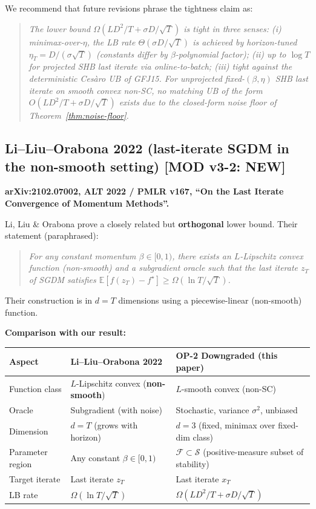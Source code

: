 \documentclass[11pt,a4paper]{article}
\theoremstyle{plain}
\theoremstyle{definition}
\theoremstyle{remark}
\newcommand{\E}{\mathbb{E}}
\newcommand{\F}{\mathcal{F}}
\newcommand{\Sset}{\mathcal{S}}
\begin{document}
We recommend that future revisions phrase the tightness claim as:

\begin{quote}
\emph{The lower bound $\Omega(LD^2/T + \sigma D/\sqrt T)$ is tight in three senses: (i) minimax-over-$\eta$, the LB rate $\Theta(\sigma D/\sqrt T)$ is achieved by horizon-tuned $\eta_T = D/(\sigma\sqrt T)$ (constants differ by $\beta$-polynomial factor); (ii) up to $\log T$ for projected SHB last iterate via online-to-batch; (iii) tight against the deterministic Ces\`aro UB of GFJ15. For unprojected fixed-$(\beta,\eta)$ SHB last iterate on smooth convex non-SC, no matching UB of the form $O(LD^2/T + \sigma D/\sqrt T)$ exists due to the closed-form noise floor of Theorem~\ref{thm:noise-floor}.}
\end{quote}

\subsection{Li--Liu--Orabona 2022 (last-iterate SGDM in the non-smooth setting) \textbf{[MOD v3-2: NEW]}}

\textbf{arXiv:2102.07002, ALT 2022 / PMLR v167, ``On the Last Iterate Convergence of Momentum Methods''.}

Li, Liu \& Orabona prove a closely related but \textbf{orthogonal} lower bound. Their statement (paraphrased):

\begin{quote}
\emph{For any constant momentum $\beta \in [0,1)$, there exists an $L$-Lipschitz convex function (non-smooth) and a subgradient oracle such that the last iterate $z_T$ of SGDM satisfies $\E[f(z_T) - f^\star] \geq \Omega(\ln T / \sqrt T)$.}
\end{quote}

Their construction is in $d = T$ dimensions using a piecewise-linear (non-smooth) function.

\textbf{Comparison with our result:}

\begin{center}
\begin{tabular}{@{}lll@{}}
\toprule
Aspect & Li--Liu--Orabona 2022 & OP-2 Downgraded (this paper) \\
\midrule
Function class & $L$-Lipschitz convex (\textbf{non-smooth}) & $L$-smooth convex (non-SC) \\
Oracle & Subgradient (with noise) & Stochastic, variance $\sigma^2$, unbiased \\
Dimension & $d = T$ (grows with horizon) & $d = 3$ (fixed, minimax over fixed-dim class) \\
Parameter region & Any constant $\beta \in [0,1)$ & $\F \subset \Sset$ (positive-measure subset of stability) \\
Target iterate & Last iterate $z_T$ & Last iterate $x_T$ \\
LB rate & $\Omega(\ln T / \sqrt T)$ & $\Omega(LD^2/T + \sigma D/\sqrt T)$ \\
\bottomrule
\end{tabular}
\end{center}
\end{document}
